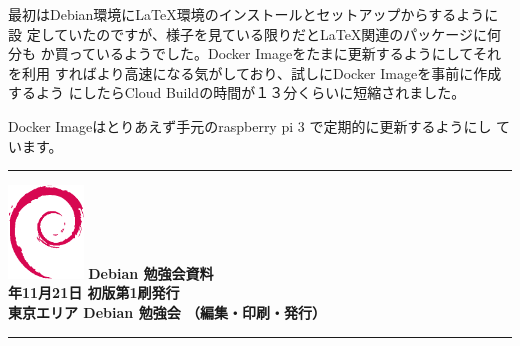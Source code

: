\documentclass[mingoth,a4paper]{jsarticle}
\newcommand{\debmtgyear}{2020}
\newcommand{\debmtgmonth}{11}
\newcommand{\debmtgdate}{21}
\begin{document}
最初はDebian環境にLaTeX環境のインストールとセットアップからするように設
定していたのですが、様子を見ている限りだとLaTeX関連のパッケージに何分も
か買っているようでした。Docker Imageをたまに更新するようにしてそれを利用
すればより高速になる気がしており、試しにDocker Imageを事前に作成するよう
にしたらCloud Buildの時間が１３分くらいに短縮されました。

Docker Imageはとりあえず手元のraspberry pi 3 で定期的に更新するようにし
ています。

\mbox{}\newpage
\mbox{}\newpage

\vspace*{15cm}
\hrule
\vspace{2mm}
\includegraphics[width=2cm]{image200502/openlogo-nd.eps}
\noindent \Large \bf Debian 勉強会資料\\
\noindent \normalfont \debmtgyear{}年\debmtgmonth{}月\debmtgdate{}日 \hspace{5mm}  初版第1刷発行\\
\noindent \normalfont 東京エリア Debian 勉強会 （編集・印刷・発行）\\
\hrule
\end{document}
